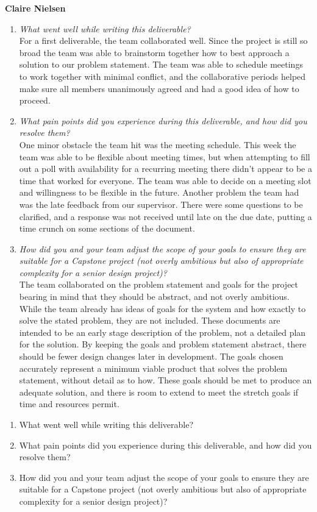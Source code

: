 \documentclass{article}
\begin{document}
\textbf{Claire Nielsen}
\begin{enumerate}
    \item \textit{What went well while writing this deliverable?}\\
    For a first deliverable, the team collaborated well. Since the project is still so broad the team was able to brainstorm together how to best approach a solution to our problem statement. The team was able to schedule meetings to work together with minimal conflict, and the collaborative periods helped make sure all members unanimously agreed and had a good idea of how to proceed. 
    \item \textit{What pain points did you experience during this deliverable, and how did you resolve them?}\\
    One minor obstacle the team hit was the meeting schedule. This week the team was able to be flexible about meeting times, but when attempting to fill out a poll with availability for a recurring meeting there didn’t appear to be a time that worked for everyone. The team was able to decide on a meeting slot and willingness to be flexible in the future. Another problem the team had was the late feedback from our supervisor. There were some questions to be clarified, and a response was not received until late on the due date, putting a time crunch on some sections of the document. 
    \item \textit{How did you and your team adjust the scope of your goals to ensure they are suitable for a Capstone project (not overly ambitious but also of appropriate complexity for a senior design project)?}\\
    The team collaborated on the problem statement and goals for the project bearing in mind that they should be abstract, and not overly ambitious. While the team already has ideas of goals for the system and how exactly to solve the stated problem, they are not included. These documents are intended to be an early stage description of the problem, not a detailed plan for the solution. By keeping the goals and problem statement abstract, there should be fewer design changes later in development. The goals chosen accurately represent a minimum viable product that solves the problem statement, without detail as to how. These goals should be met to produce an adequate solution, and there is room to extend to meet the stretch goals if time and resources permit.
\end{enumerate}

\begin{enumerate}
    \item What went well while writing this deliverable? 
    \item What pain points did you experience during this deliverable, and how
    did you resolve them?
    \item How did you and your team adjust the scope of your goals to ensure
    they are suitable for a Capstone project (not overly ambitious but also of
    appropriate complexity for a senior design project)?
\end{enumerate}  
\end{document}
